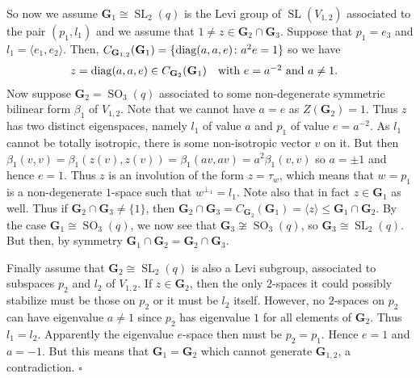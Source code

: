 \documentclass[12pt]{amsart}
\theoremstyle{definition}
\newcommand{\epf}{\qed}
\newcommand{\diag}{\mathop{\rm diag}\nolimits}
\DeclareMathOperator{\SL}{SL}
\DeclareMathOperator{\SO}{SO}
\renewcommand{\qed}{\hfill $\square$}
\newcommand{\amgrpG}{{\mathbf{G}}}
\begin{document}
So now we assume $\amgrpG_1\cong\SL_2(q)$ is the Levi group of $\SL(V_{1,2})$ 
associated to the pair $(p_1,l_1)$ and we assume that 
$1\ne z\in \amgrpG_2\cap\amgrpG_3$.
Suppose that $p_1=e_3$ and $l_1=\langle e_1,e_2\rangle$. Then,  $C_{\amgrpG_{1,2}}(\amgrpG_1) =\{\diag(a,a,e)\colon a^2e=1\}$ so we have 
\begin{align*}
z&=\diag(a,a,e)\in C_{\amgrpG_2}(\amgrpG_1) &&\mbox{with $e=a^{-2}$ and $a\ne 1$}.
\end{align*}
Now suppose $\amgrpG_2=\SO_3(q)$ associated to some non-degenerate symmetric bilinear form $\beta_1$ of $V_{1,2}$.
Note that we cannot have $a=e$ as $Z(\amgrpG_2)=1$. Thus $z$ has two distinct eigenspaces, namely $l_1$ of value $a$ and $p_1$ of value $e=a^{-2}$.
As $l_1$ cannot be totally isotropic, there is some non-isotropic vector $v$ on it. But then 
$\beta_1(v,v)=\beta_1(z(v),z(v))=\beta_1(av,av)=a^2\beta_1(v,v)$ so $a=\pm 1$ and hence $e=1$.
Thus $z$ is an involution of the form $z=\tau_{w}$, which means that $w=p_1$ is a non-degenerate $1$-space such that $w^{\perp_1}=l_1$.
Note also that in fact $z\in \amgrpG_1$ as well.
Thus if $\amgrpG_2\cap\amgrpG_3\ne \{1\}$, then 
$\amgrpG_2\cap\amgrpG_3= C_{\amgrpG_2}(\amgrpG_1)=\langle z\rangle\le \amgrpG_1\cap\amgrpG_2$.
By the case $\amgrpG_1\cong\SO_3(q)$, we now see that $\amgrpG_3\not\cong\SO_3(q)$, so $\amgrpG_3\cong\SL_2(q)$. 
But then, by symmetry $\amgrpG_1\cap\amgrpG_2=\amgrpG_2\cap\amgrpG_3$.

Finally assume that $\amgrpG_2\cong\SL_2(q)$ is also a Levi subgroup, associated to subspaces $p_2$ and $l_2$ of $V_{1,2}$.
If $z\in \amgrpG_2$, then the only $2$-spaces it could possibly stabilize must be those on $p_2$ or 
 it must be $l_2$ itself. However, no $2$-spaces on $p_2$ can have eigenvalue $a\ne 1$ since $p_2$ has eigenvalue $1$ for all elements of $\amgrpG_2$. Thus $l_1=l_2$.  Apparently the eigenvalue $e$-space then must be $p_2=p_1$. Hence $e=1$ and $a=-1$. But this means that $\amgrpG_1=\amgrpG_2$ which cannot generate $\amgrpG_{1,2}$, a contradiction.
\epf
\end{document}
